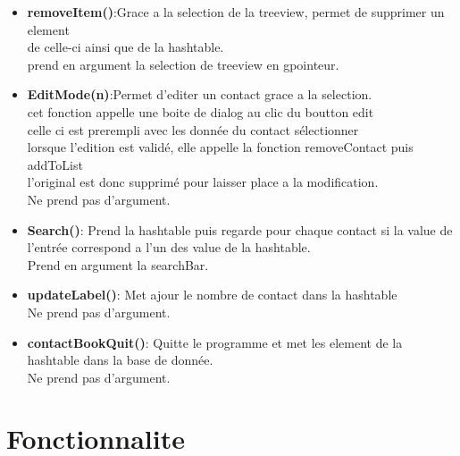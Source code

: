 \documentclass[a4paper, 11pt]{article}
\begin{document}
\begin{itemize}[label=\textbullet, font=\normalsize]
\item{\bf removeItem()}:Grace a la selection de la treeview, permet de supprimer un element\\
de celle-ci ainsi que de la hashtable.\\
prend en argument la selection de treeview en gpointeur.\\
\item{\bf EditMode(n)}:Permet d'editer un contact grace a la selection.\\
cet fonction appelle une boite de dialog au clic du boutton edit\\
celle ci est prerempli avec les donnée du contact sélectionner\\
lorsque l'edition est validé, elle appelle la fonction removeContact puis addToList\\
l'original est donc supprimé pour laisser place a la modification.\\
Ne prend pas d'argument.\\

\item{\bf Search()}: Prend la hashtable puis regarde pour chaque contact si la value de\\
l'entrée correspond a l'un des value de la hashtable.\\
Prend en argument la searchBar.\\

\item{\bf updateLabel()}: Met ajour le nombre de contact dans la hashtable\\
 Ne prend pas d'argument.\\


\item{\bf contactBookQuit()}: Quitte le programme et met les element de la\\
 hashtable dans la base de donnée.\\
 Ne prend pas d'argument.\\

\end{itemize}

\newpage
\section{Fonctionnalite}
\end{document}
